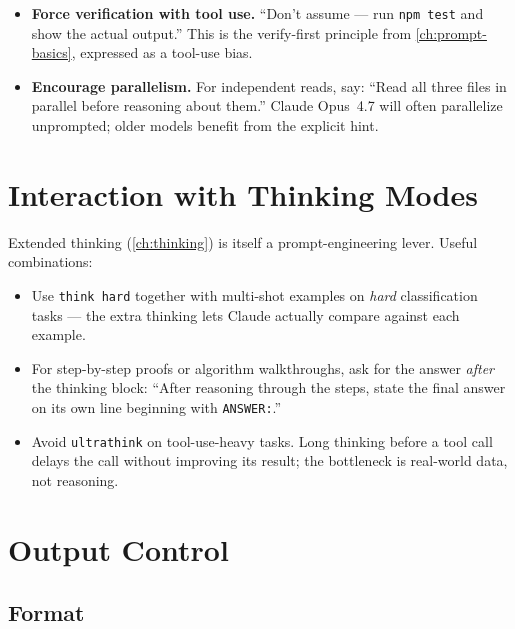 \begin{itemize}
  \item \textbf{Force verification with tool use.} ``Don't assume — run
        \texttt{npm test} and show the actual output.'' This is the
        verify-first principle from \cref{ch:prompt-basics}, expressed
        as a tool-use bias.
  \item \textbf{Encourage parallelism.} For independent reads, say:
        ``Read all three files in parallel before reasoning about them.''
        Claude Opus~4.7 will often parallelize unprompted; older models
        benefit from the explicit hint.
\end{itemize}

\section{Interaction with Thinking Modes}
\label{sec:advanced-thinking}


Extended thinking (\cref{ch:thinking}) is itself a prompt-engineering
lever. Useful combinations:

\begin{itemize}
  \item Use \texttt{think hard} together with multi-shot examples on
        \emph{hard} classification tasks — the extra thinking lets Claude
        actually compare against each example.
  \item For step-by-step proofs or algorithm walkthroughs, ask for the
        answer \emph{after} the thinking block:
        ``After reasoning through the steps, state the final answer on
        its own line beginning with \texttt{ANSWER:}.''
  \item Avoid \texttt{ultrathink} on tool-use-heavy tasks. Long thinking
        before a tool call delays the call without improving its result;
        the bottleneck is real-world data, not reasoning.
\end{itemize}

\section{Output Control}
\label{sec:output-control}


\subsection{Format}

